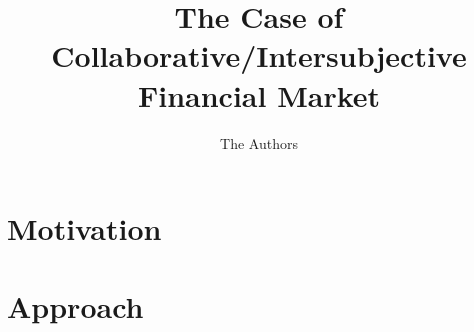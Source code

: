 \documentclass[workingdraft]{paper}
\begin{document}
\title{The Case of Collaborative/Intersubjective Financial Market}

\author{The Authors}

\begin{abstract}

\end{abstract}

\maketitle
\pagestyle{plain}

\section{Motivation}
\label{sec:motivation}


\section{Approach}
\label{sec:approach}



\end{document}
